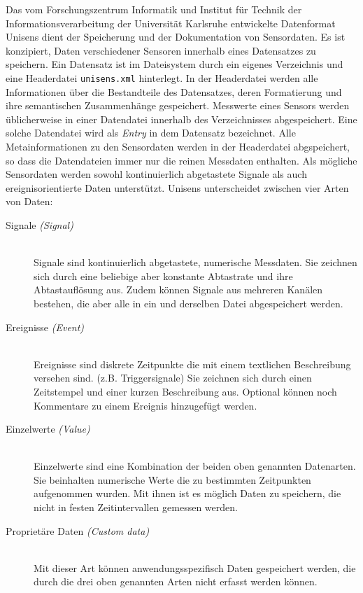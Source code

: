 Das vom Forschungszentrum Informatik und Institut f\"ur Technik der Informationsverarbeitung der Universit\"at Karlsruhe entwickelte Datenformat Unisens dient der Speicherung und der Dokumentation von Sensordaten.
Es ist konzipiert, Daten verschiedener Sensoren innerhalb eines Datensatzes zu speichern.
Ein Datensatz ist im Dateisystem durch ein eigenes Verzeichnis und eine Headerdatei \verb|unisens.xml| hinterlegt.
In der Headerdatei werden alle Informationen \"uber die Bestandteile des Datensatzes, deren Formatierung und ihre semantischen Zusammenh\"ange gespeichert.
Messwerte eines Sensors werden \"ublicherweise in einer Datendatei innerhalb des Verzeichnisses abgespeichert.
Eine solche Datendatei wird als \emph{Entry} in dem Datensatz bezeichnet.
Alle Metainformationen zu den Sensordaten werden in der Headerdatei abgspeichert, so dass die Datendateien immer nur die reinen Messdaten enthalten.
Als m\"ogliche Sensordaten werden sowohl kontinuierlich abgetastete Signale als auch ereignisorientierte Daten unterst\"utzt.
Unisens unterscheidet zwischen vier Arten von Daten:
\begin{description}
	\item[Signale \emph{(Signal)}] \hfill \\
		Signale sind kontinuierlich abgetastete, numerische Messdaten.
		Sie zeichnen sich durch eine beliebige aber konstante Abtastrate und ihre Abtastaufl\"osung aus.
		Zudem k\"onnen Signale aus mehreren Kan\"alen bestehen, die aber alle in ein und derselben Datei abgespeichert werden.
	\item[Ereignisse \emph{(Event)}] \hfill \\
		Ereignisse sind diskrete Zeitpunkte die mit einem textlichen Beschreibung versehen sind. (z.B. Triggersignale)
		Sie zeichnen sich durch einen Zeitstempel und einer kurzen Beschreibung aus.
		Optional k\"onnen noch Kommentare zu einem Ereignis hinzugef\"ugt werden.
	\item[Einzelwerte \emph{(Value)}] \hfill \\
		Einzelwerte sind eine Kombination der beiden oben genannten Datenarten.
		Sie beinhalten numerische Werte die zu bestimmten Zeitpunkten aufgenommen wurden.
		Mit ihnen ist es m\"oglich Daten zu speichern, die nicht in festen Zeitintervallen gemessen werden.
	\item[Propriet\"are Daten \emph{(Custom data)}] \hfill \\
		Mit dieser Art k\"onnen anwendungsspezifisch Daten gespeichert werden, die durch die drei oben genannten Arten nicht erfasst werden k\"onnen.
\end{description}

